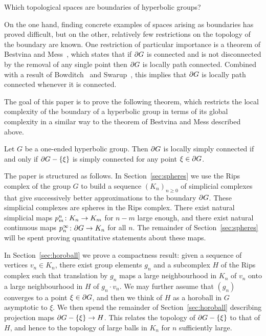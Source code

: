 \documentclass[a4paper]{article}
\begin{document}
\begin{question}\cite[Question A]{kapovichkleiner00}
  Which topological spaces are boundaries of hyperbolic groups?
\end{question}

On the one hand, finding concrete examples of spaces arising as boundaries has
proved difficult, but on the other, relatively few restrictions on the topology
of the boundary are known. One restriction of particular importance is a
theorem of Bestvina and Mess~\cite{bestvinamess91}, which states that if
$\partial G$ is connected and is not disconnected by the removal of any single
point then $\partial G$ is locally path connected. Combined with a result of
Bowditch~\cite{bowditch98b} and Swarup~\cite{swarup96}, this implies that
$\partial G$ is locally path connected whenever it is connected.

The goal of this paper is to prove the following theorem, which restricts the
local complexity of the boundary of a hyperbolic group in terms of its global
complexity in a similar way to the theorem of Bestvina and Mess described
above.

\begin{theorem}\label{thm:main_theorem}
  Let $G$ be a one-ended hyperbolic group. Then $\partial G$ is locally simply
  connected if and only if $\partial G - \left\{\xi\right\}$ is simply connected for any
  point $\xi \in \partial G$.
\end{theorem}

The paper is structured as follows. In Section~\ref{sec:spheres} we use the
Rips complex of the group $G$ to build a sequence $(K_n)_{n \geq 0}$ of
simplicial complexes that give successively better approximations to the
boundary $\partial G$. These simplicial complexes are spheres in the Rips
complex. There exist natural simplicial maps $p^n_m\colon K_n\to K_m$ for $n -
m$ large enough, and there exist natural continuous maps
$p^\infty_n\colon\partial G \to K_n$ for all $n$.  The remainder of
Section~\ref{sec:spheres} will be spent proving quantitative statements about
these maps.

In Section~\ref{sec:horoball} we prove a compactness result: given a sequence
of vertices $v_n \in K_n$, there exist group elements $g_n$ and a subcomplex
$H$ of the Rips complex such that translation by $g_n$ maps a large
neighbourhood in $K_n$ of $v_n$ onto a large neighbourhood in $H$ of $g_n\cdot
v_n$.  We may further assume that $(g_n)$ converges to a point $\xi \in
\partial G$, and then we think of $H$ as a horoball in $G$ asymptotic to
$\xi$. We then spend the remainder of Section~\ref{sec:horoball} describing
projection maps $\partial G - \left\{\xi\right\} \to H$. This relates the topology of
$\partial G - \left\{\xi\right\}$ to that of $H$, and hence to the topology of large
balls in $K_n$ for $n$ sufficiently large.
\end{document}
